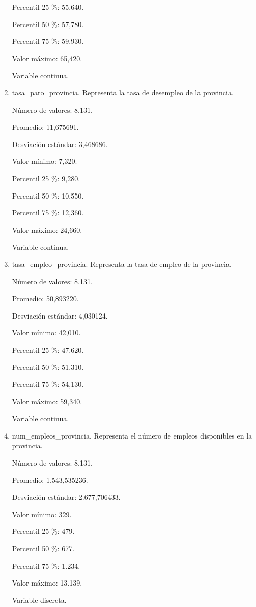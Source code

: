 \begin{enumerate}
	Percentil 25 \%: 55,640.
	
	Percentil 50 \%: 57,780.
	
	Percentil 75 \%: 59,930.
	
	Valor máximo: 65,420.
	
	Variable continua.

	\item tasa\_paro\_provincia. Representa la tasa de desempleo de la provincia.
	
	Número de valores: 8.131.
	
	Promedio: 11,675691.
	
	Desviación estándar: 3,468686.
	
	Valor mínimo: 7,320.
	
	Percentil 25 \%: 9,280.
	
	Percentil 50 \%: 10,550.
	
	Percentil 75 \%: 12,360.
	
	Valor máximo: 24,660.
	
	Variable continua.

	\item tasa\_empleo\_provincia. Representa la tasa de empleo de la provincia.
	
	Número de valores: 8.131.
	
	Promedio: 50,893220.
	
	Desviación estándar: 4,030124.
	
	Valor mínimo: 42,010.
	
	Percentil 25 \%: 47,620.
	
	Percentil 50 \%: 51,310.
	
	Percentil 75 \%: 54,130.
	
	Valor máximo: 59,340.
	
	Variable continua.

	\item num\_empleos\_provincia. Representa el número de empleos disponibles en la provincia.
	
	Número de valores: 8.131.
	
	Promedio: 1.543,535236.
	
	Desviación estándar: 2.677,706433.
	
	Valor mínimo: 329.
	
	Percentil 25 \%: 479.
	
	Percentil 50 \%: 677.
	
	Percentil 75 \%: 1.234.
	
	Valor máximo: 13.139.
	
	Variable discreta.


\end{enumerate}
